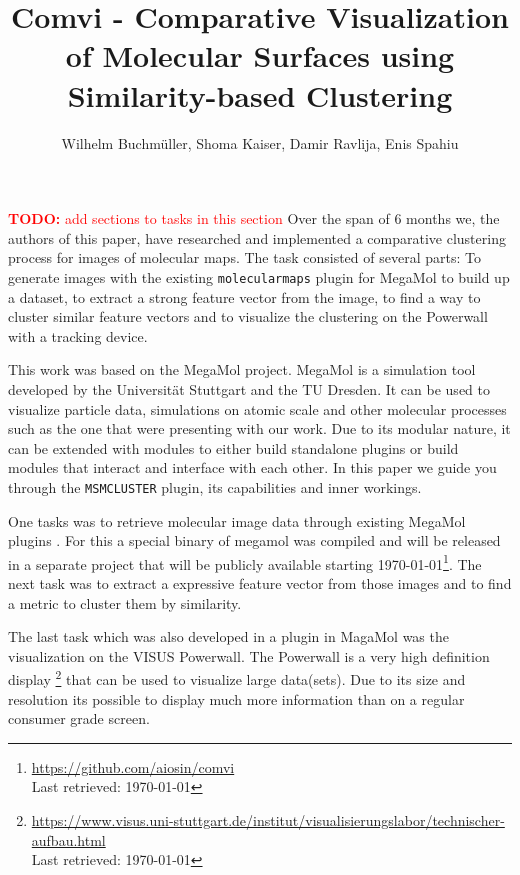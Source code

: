 \documentclass[journal]{vgtc}       %
\title{Comvi - Comparative Visualization of Molecular Surfaces using Similarity-based Clustering}
\author{Wilhelm Buchm\"uller, Shoma Kaiser, Damir Ravlija, Enis Spahiu}
\newcommand{\todo}[1]{\textcolor{red}{\textbf{TODO:} #1}}
\begin{document}

\label{sec:intro}
%
\maketitle
%
\todo{add sections to tasks in this section}%
Over the span of 6 months we, the authors of this paper,  have researched and implemented a comparative clustering  process for images of molecular maps.
The task consisted of several parts: To generate images with the existing \verb|molecularmaps| plugin for MegaMol \cite{MegaMol} to build up a dataset, to extract a strong feature vector from the image, to find a way to cluster similar feature vectors and to visualize the clustering on the Powerwall with a tracking device.

This work was based on the MegaMol\cite{MegaMol} project. MegaMol is a simulation tool developed by the Universit\"at Stuttgart and the TU Dresden. It can be used to visualize particle data, simulations on atomic scale and other molecular processes such as the one that were presenting with our work. 
Due to its modular nature, it can be extended with modules to either build standalone plugins or build modules that interact and interface with each other.
In this paper we guide you through the \verb|MSMCLUSTER| plugin, its capabilities and inner workings.

One tasks was to retrieve molecular image data through existing MegaMol plugins \cite{molecularmaps}. For this a special binary of megamol was compiled and will be released in a separate project that will be publicly available starting \today \footnote{\url{https://github.com/aiosin/comvi}\\ Last retrieved: \today}.
The next task was to extract a expressive feature vector from those images and to find a metric to cluster them by similarity.

The last task which was also developed in a plugin in MagaMol was the visualization on the VISUS Powerwall. The Powerwall is a very high definition display \footnote{\url{https://www.visus.uni-stuttgart.de/institut/visualisierungslabor/technischer-aufbau.html} \\ Last retrieved: \today } that can be used to visualize large data(sets). Due to its size and resolution its possible to display much more information than on a regular consumer grade screen. 
\end{document}
